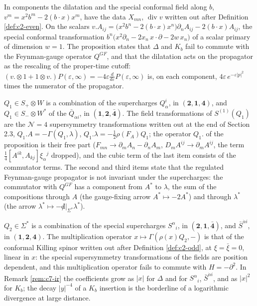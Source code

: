 \begin{remark}
In components the dilatation and the special conformal field along $b$, $v^m=x^2b^m-2(b\cdot x)x^m$, have the data $X_{mn}$, $\operatorname{div}v$ written out after Definition \ref{def:c2-even}. On the scalars $v.A_{ij}=\big(x^2b^n-2(b\cdot x)x^n\big)\partial_nA_{ij}-2(b\cdot x)A_{ij}$, the special conformal transformation $b^n\big(x^2\partial_n-2x_n\,x\cdot\partial-2w\,x_n\big)$ of a scalar primary of dimension $w=1$. The proposition states that $\Delta$ and $K_b$ fail to commute with the Feynman-gauge operator $Q^{GF}$, and that the dilatation acts on the propagator as the rescaling of the proper-time cutoff: $(v.\otimes1+1\otimes v.)P(\varepsilon,\infty)=-4\varepsilon\frac{d}{d\varepsilon}P(\varepsilon,\infty)$ is, on each component, $4\varepsilon\,e^{-\varepsilon|p|^2}$ times the numerator of the propagator.
\end{remark}

\begin{remark}
$Q_1\in S_+\otimes W$ is a combination of the supercharges $Q^i_\alpha$, in $(\mathbf2,\mathbf1,\mathbf4)$, and $Q_1\in S_-\otimes W^*$ of the $\bar Q_{\dot\alpha i}$, in $(\mathbf1,\mathbf2,\bar{\mathbf4})$. The field transformations of $S^{(1)}(Q_1)$ are the $\mathcal N=4$ supersymmetry transformations written out at the end of Section 2.3, $Q_1.A=-\Gamma(Q_1,\lambda)$, $Q_1.\lambda=-\tfrac12\rho(F_A)Q_1$; the operator $Q_1.$ of the proposition is their free part ($F_{mn}\to\partial_mA_n-\partial_nA_m$, $D_mA^{ij}\to\partial_mA^{ij}$, the term $\tfrac14[A^{ik},A_{kj}]\xi_\alpha{}^j$ dropped), and the cubic term of the last item consists of the commutator terms. The second and third items state that the regulated Feynman-gauge propagator is not invariant under the supercharges: the commutator with $Q^{GF}$ has a component from $A^*$ to $\lambda$, the sum of the compositions through $A$ (the gauge-fixing arrow $A^*\mapsto-2A^*$) and through $\lambda^*$ (the arrow $\lambda^*\mapsto-{\not d}|_{\Sigma^*}\lambda^*$).
\end{remark}

\begin{remark}
$Q_2\in\Sigma^*$ is a combination of the special supercharges $S^\alpha{}_i$, in $(\mathbf2,\mathbf1,\bar{\mathbf4})$, and $\bar S^{\dot\alpha i}$, in $(\mathbf1,\mathbf2,\mathbf4)$. The multiplication operator $x\mapsto\Gamma(\rho(x)Q_2,-)$ is that of the conformal Killing spinor written out after Definition \ref{def:c2-odd}, at $\xi=\bar\xi=0$, linear in $x$: the special supersymmetry transformations of the fields are position dependent, and this multiplication operator fails to commute with $H=-\partial^2$. In Remark \ref{rem:c7-ir} the coefficients grow as $|x|$ for $\Delta$ and for $S^\alpha{}_i$, $\bar S^{\dot\alpha i}$, and as $|x|^2$ for $K_b$; the decay $|y|^{-4}$ of a $K_b$ insertion is the borderline of a logarithmic divergence at large distance.
\end{remark}

